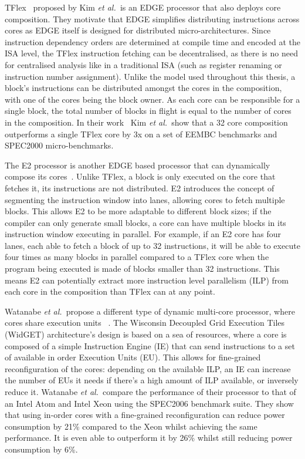 TFlex~\cite{kim2007tflex} proposed by Kim {\it et al.~}is an EDGE processor that also deploys core composition.
They motivate that EDGE simplifies distributing instructions across cores as EDGE itself is designed for distributed micro-architectures.
Since instruction dependency orders are determined at compile time and encoded at the ISA level, the TFlex instruction fetching can be decentralised, as there is no need for centralised analysis like in a traditional ISA (such as register renaming or instruction number assignment).
Unlike the model used throughout this thesis, a block's instructions can be distributed amongst the cores in the composition, with one of the cores being the block owner.
As each core can be responsible for a single block, the total number of blocks in flight is equal to the number of cores in the composition.
In their work~\cite{kim2007tflex} Kim {\it et al.~}show that a 32 core composition outperforms a single TFlex core by 3x on a set of EEMBC benchmarks and SPEC2000 micro-benchmarks.

The E2 processor is another EDGE based processor that can dynamically compose its cores~\cite{putnam2010e2}.
Unlike TFlex, a block is only executed on the core that fetches it, its instructions are not distributed.
E2 introduces the concept of segmenting the instruction window into lanes, allowing cores to fetch multiple blocks.
This allows E2 to be more adaptable to different block sizes; if the compiler can only generate small blocks, a core can have multiple blocks in its instruction window executing in parallel.
For example, if an E2 core has four lanes, each able to fetch a block of up to 32 instructions, it will be able to execute four times as many blocks in parallel compared to a TFlex core when the program being executed is made of blocks smaller than 32 instructions.
This means E2 can potentially extract more instruction level parallelism (ILP) from each core in the composition than TFlex can at any point.

Watanabe {\it et al.~}propose a different type of dynamic multi-core processor, where cores share execution units ~\cite{Watanabe2010Widget}.
The Wisconsin Decoupled Grid Execution Tiles (WidGET) architecture's design is based on a sea of resources, where a core is composed of a simple Instruction Engine (IE) that can send instructions to a set of available in order Execution Units (EU).
This allows for fine-grained reconfiguration of the cores: depending on the available ILP, an IE can increase the number of EUs it needs if there's a high amount of ILP available, or inversely reduce it.
Watanabe {\it et al.~}compare the performance of their processor to that of an Intel Atom and Intel Xeon using the SPEC2006 benchmark suite.
They show that using in-order cores with a fine-grained reconfiguration can reduce power consumption by 21\% compared to the Xeon whilst achieving the same performance.
It is even able to outperform it by 26\% whilst still reducing power consumption by 6\%.

